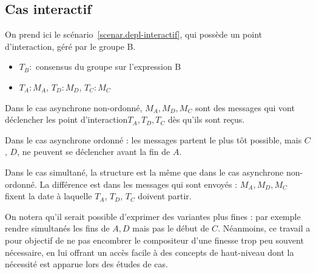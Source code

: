 \documentclass{article}
\newcommand\trigger{point d'interaction\xspace}
\begin{document}




\subsection{Cas interactif}
On prend ici le scénario~\ref{scenar.depl-interactif}, qui possède un \trigger, géré par le groupe B.
 
\begin{itemize}
	\item $T_B: $ consensus du groupe sur l'expression B
	\item $T_A: M_A$, $T_D: M_D$, $T_C: M_C$
\end{itemize}

Dans le cas asynchrone non-ordonné, $M_A, M_D, M_C$ sont des messages qui vont déclencher les \trigger $T_A, T_D, T_C$ dès qu'ils sont reçus.

Dans le cas asynchrone ordonné : les messages partent le plus tôt possible, mais $C$, $D$, ne peuvent se déclencher avant la fin de $A$.

Dans le cas simultané, la structure est la même que dans le cas asynchrone non-ordonné. La différence est dans les messages qui sont envoyés : $M_A, M_D, M_C$ fixent la date à laquelle $T_A$, $T_D$, $T_C$ doivent partir.

On notera qu'il serait possible d'exprimer des variantes plus fines : par exemple rendre simultanés les fins de $A,D$ mais pas le début de $C$. 
Néanmoins, ce travail a pour objectif de ne pas encombrer le compositeur d'une finesse trop peu souvent nécessaire, en lui offrant un accès facile à des concepts de haut-niveau dont la nécessité est apparue lors des études de cas.
\end{document}
